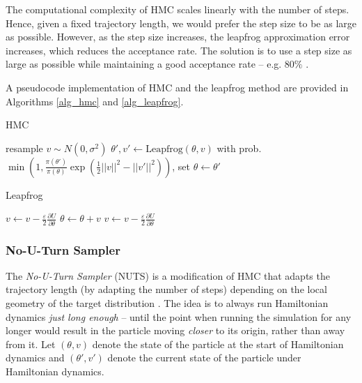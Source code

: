 \documentclass[12pt]{article}
\begin{document}
{The computational complexity of HMC scales linearly with the number of steps. Hence, given a fixed trajectory length, we would prefer the step size to be as large as possible. However, as the step size increases, the leapfrog approximation error increases, which reduces the acceptance rate. The solution is to use a step size as large as possible while maintaining a good acceptance rate -- e.g. $80\%$ \cite{bnn_posterior}.


A pseudocode implementation of HMC and the leapfrog method are provided in Algorithms \ref{alg_hmc} and \ref{alg_leapfrog}.

\begin{algorithm}
\caption{HMC}
\label{alg_hmc}
\begin{algorithmic}
 
	\State resample $v \sim N(0, \sigma^2)$ 
	\State $\theta', v' \gets \textrm{Leapfrog}(\theta, v)$ 
	\State with prob. $\min{\left(1, \frac{\pi(\theta')}{\pi(\theta)} \exp \left( \frac{1}{2}||v||^2 - ||v'||^2 \right) \right)}$, set $\theta \gets \theta'$ 
\EndFor
\end{algorithmic}
\end{algorithm}

\begin{algorithm}
\caption{Leapfrog}
\label{alg_leapfrog}
\begin{algorithmic}
 
\State $v \gets v - \frac{\varepsilon}{2} \frac{\partial U}{\partial \theta}$ 
\State $\theta \gets \theta + v$ 
\State $v \gets v - \frac{\varepsilon}{2} \frac{\partial U}{\partial \theta}$ 
\EndFor
\end{algorithmic}
\end{algorithm}

\subsubsection{No-U-Turn Sampler}
\label{sec_nuts}

The \textit{No-U-Turn Sampler} (NUTS) is a modification of HMC that adapts the trajectory length (by adapting the number of steps) depending on the local geometry of the target distribution \cite{nuts}. The idea is to always run Hamiltonian dynamics \textit{just long enough} -- until the point when running the simulation for any longer would result in the particle moving \textit{closer} to its origin, rather than away from it. Let $(\theta, v)$ denote the state of the particle at the start of Hamiltonian dynamics and $(\theta', v')$ denote the current state of the particle under Hamiltonian dynamics.

}
\end{document}
